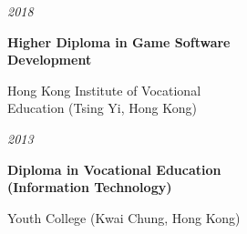 {\small
  {\itshape 2018}\par\vspace{3pt}
  {\color{eduBlue}\bfseries Higher Diploma in Game Software\\Development}\par\vspace{4pt}
  Hong Kong Institute of Vocational\\Education (Tsing Yi, Hong Kong)\par\vspace{10pt}
  {\itshape 2013}\par\vspace{3pt}
  {\color{eduBlue}\bfseries Diploma in Vocational Education\\(Information Technology)}\par\vspace{4pt}
  Youth College (Kwai Chung, Hong Kong)%
}\par
